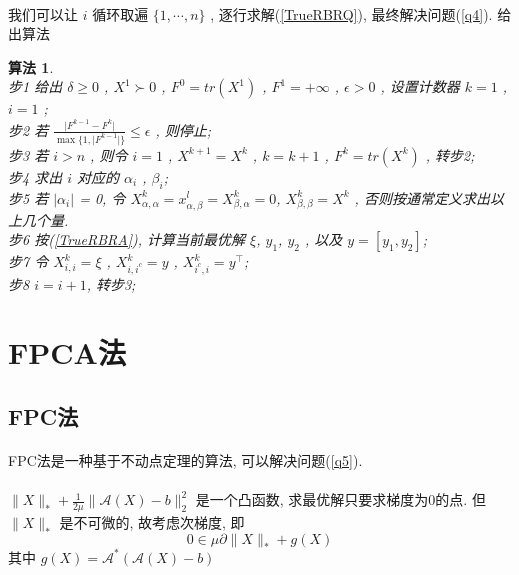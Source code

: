 \documentclass[UTF8]{ctexart}
\newtheorem{algo}{\bf 算法}
\newcommand{\abs}[1]{\lvert#1\rvert}
\newcommand{\norm}[1]{\lVert#1\rVert}
\newcommand{\nunorm}{\norm{X}_*}
\numberwithin{equation}{section}
\begin{document}
			\paragraph{}
				\quad 我们可以让 $i$ 循环取遍 $\{1, \cdots, n\}$ , 逐行求解(\ref{TrueRBRQ}), 最终解决问题(\ref{q4}). 给出算法
				\begin{algo}
					\quad\\
					步1 \quad 给出 $\delta \ge 0$ , $X^1 \succ 0$ , $F^0 = tr(X^1)$ , $F^1=+\infty$ , $\epsilon>0$ , 设置计数器 $k=1$ , $i=1$ ;\\
					步2 \quad 若 $\frac{\abs{F^{k-1}-F^k}}{\max\{1,\abs{F^{k-1}}\}}\leq\epsilon$ , 则停止;\\
					步3 \quad 若 $i>n$ , 则令 $i=1$ , $X^{k + 1}=X^k$ , $k=k + 1$ , $F^k = tr(X^k)$ , 转步2;\\
					步4 \quad 求出 $i$ 对应的 $\alpha_i$ , $\beta_i$;\\
					步5 \quad 若 $\vert{\alpha_i}\vert$ = 0, 令 $X^k_{\alpha, \alpha} = x^l_{\alpha, \beta} = X^k_{\beta, \alpha} = 0$, $X^k_{\beta, \beta} = X^k$ , 否则按通常定义求出以上几个量.\\
					步6 \quad 按(\ref{TrueRBRA}), 计算当前最优解 $\xi$, $y_1$, $y_2$ , 以及 $y = [y_1, y_2]$;\\
					步7 \quad 令 $X^{k}_{i, i}=\xi$ , $X^{k}_{i,i^c} = y$ , $X^{k}_{i^c,i}=y^\top$;\\
					步8 \quad $i=i+1$, 转步3;
				\end{algo}


	\section{FPCA法}
		\subsection{FPC法}
			\paragraph{}
				\quad FPC法是一种基于不动点定理的算法, 可以解决问题(\ref{q5}). 

			\paragraph{}
				\quad $\nunorm+\frac{1}{2\mu}\norm{\mathcal{A}(X)-b}_2^2$ 是一个凸函数, 求最优解只要求梯度为0的点. 但 $\nunorm$ 是不可微的, 故考虑次梯度, 即
				\begin{equation}\label{SubGrad}
					0 \in \mu \partial \nunorm + g(X)
				\end{equation}
				其中 $g(X) = \mathcal{A}^*(\mathcal{A}(X) - b)$
			
\end{document}
